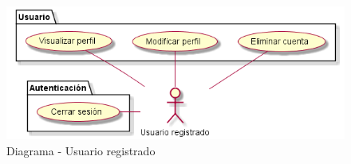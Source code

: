 \begin{figure}[H]
	\centering
	\includegraphics[width=1\linewidth]{5-AnalisisDelSistemaDeInformacion//Casos de uso//usuarioRegistrado/diagrama.png}
	\caption{Diagrama - Usuario registrado}
\end{figure}